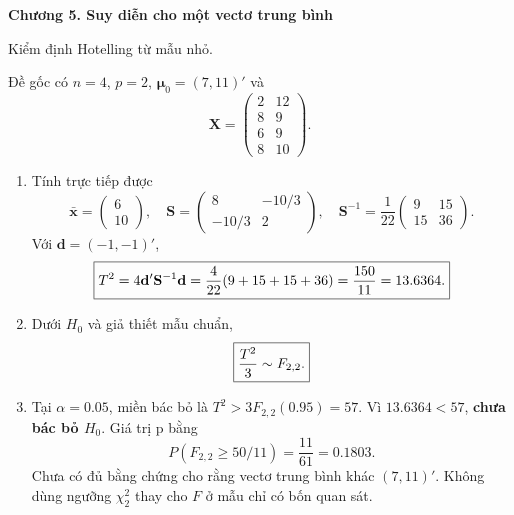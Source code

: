 \medskip
\begin{center}\textbf{Chương 5. Suy diễn cho một vectơ trung bình}\end{center}

\begin{problem}[Bài 5.1.]
Kiểm định Hotelling từ mẫu nhỏ.
\end{problem}
\begin{solution}
Đề gốc có $n=4$, $p=2$, $\boldsymbol\mu_0=(7,11)'$ và
\[
\mathbf X=\begin{pmatrix}2&12\\8&9\\6&9\\8&10\end{pmatrix}.
\]
\begin{enumerate}[label=\textbf{\alph*)}]
\item Tính trực tiếp được
\[
\bar{\mathbf x}=\begin{pmatrix}6\\10\end{pmatrix},\quad
\mathbf S=\begin{pmatrix}8&-10/3\\-10/3&2\end{pmatrix},\quad
\mathbf S^{-1}=\frac1{22}\begin{pmatrix}9&15\\15&36\end{pmatrix}.
\]
Với $\mathbf d=(-1,-1)'$,
\[
\boxed{T^2=4\mathbf d'\mathbf S^{-1}\mathbf d
=\frac4{22}(9+15+15+36)=\frac{150}{11}=13.6364.}
\]
\item Dưới $H_0$ và giả thiết mẫu chuẩn,
\[
\boxed{\frac{T^2}{3}\sim F_{2,2}.}
\]
\item Tại $\alpha=0.05$, miền bác bỏ là
$T^2>3F_{2,2}(0.95)=57$. Vì $13.6364<57$, \textbf{chưa bác bỏ $H_0$}.
Giá trị p bằng
\[
P(F_{2,2}\ge50/11)=\frac{11}{61}=0.1803.
\]
Chưa có đủ bằng chứng cho rằng vectơ trung bình khác $(7,11)'$.
Không dùng ngưỡng $\chi_2^2$ thay cho $F$ ở mẫu chỉ có bốn quan sát.
\end{enumerate}
\end{solution}

